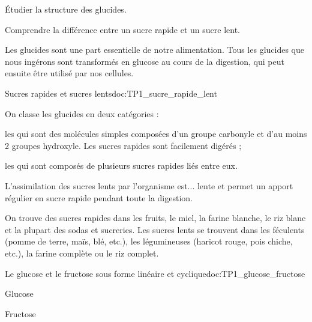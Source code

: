 \tetePremStssBiol
{}

\begin{objectifs}
  \item Étudier la structure des glucides.
  \item Comprendre la différence entre un sucre rapide et un sucre lent.
\end{objectifs}

\begin{contexte}
  Les glucides sont une part essentielle de notre alimentation.
  Tous les glucides que nous ingérons sont transformés en glucose au cours de la digestion,
  qui peut ensuite être utilisé par nos cellules.

\end{contexte}



\begin{doc}{Sucres rapides et sucres lents}{doc:TP1_sucre_rapide_lent}
  \begin{importants}
    On classe les glucides en deux catégories :
    \begin{listePoints}
      \item les  qui sont des molécules simples composées d'un groupe carbonyle et d'au moins 2 groupes hydroxyle. Les sucres rapides sont facilement digérés ;
      \item les  qui sont composés de plusieurs sucres rapides liés entre eux.  
    \end{listePoints}
    L'assimilation des sucres lents par l'organisme est... lente et permet un apport régulier en sucre rapide pendant toute la digestion.
  \end{importants}

  On trouve des sucres rapides dans les fruits, le miel, la farine blanche, le riz blanc et la plupart des sodas et sucreries.
  Les sucres lents se trouvent dans les féculents (pomme de terre, maïs, blé, etc.), les légumineuses (haricot rouge, pois chiche, etc.), la farine complète ou le riz complet.
\end{doc}

\begin{doc}{Le glucose et le fructose sous forme linéaire et cyclique}{doc:TP1_glucose_fructose}
  \begin{multicols}{2}
  \begin{center}
    \separationBlocs{
      \centering
      \chemfig{[:-90]!\glucoseSemiDev}
    }{
      \centering
      \chemfigHaworth{!\glucoseHaw} \\[4pt]
    }
    Glucose

    \separationBlocs{
      \centering
      \chemfig{[:-90] !\fructoseSemiDev} \;
    }{
      \centering
      \chemfigHaworth{!\fructoseHaw} \\[4pt]
    }
    Fructose
  \end{center}
  \end{multicols}
\end{doc}

